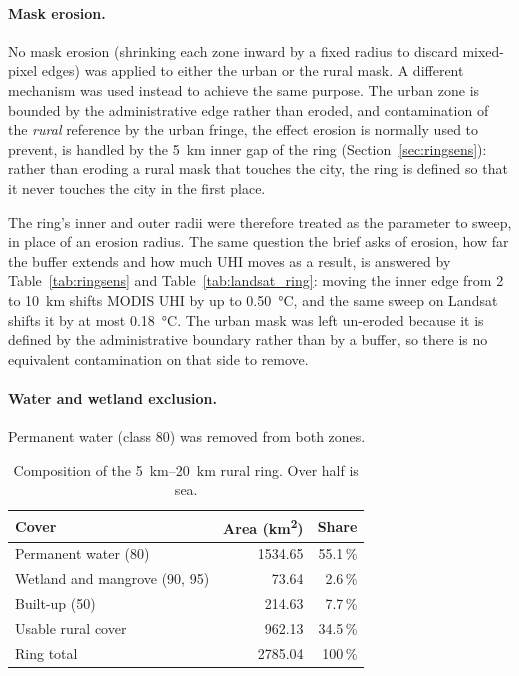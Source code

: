 \documentclass[11pt,a4paper]{article}
\begin{document}
\paragraph{Mask erosion.}
\label{sec:erosion}

No mask erosion (shrinking each zone inward by a fixed radius to
discard mixed-pixel edges) was applied to either the urban or the
rural mask. A different mechanism was used instead to achieve the same
purpose. The urban zone is bounded by the administrative edge rather
than eroded, and contamination of the \emph{rural} reference by the
urban fringe, the effect erosion is normally used to prevent, is
handled by the \SI{5}{\kilo\metre} inner gap of the ring
(Section~\ref{sec:ringsens}): rather than eroding a rural mask that
touches the city, the ring is defined so that it never touches the
city in the first place.

The ring's inner and outer radii were therefore treated as the
parameter to sweep, in place of an erosion radius. The same question
the brief asks of erosion, how far the buffer extends and how much UHI
moves as a result, is answered by
Table~\ref{tab:ringsens} and Table~\ref{tab:landsat_ring}: moving the
inner edge from \SI{2}{} to \SI{10}{\kilo\metre} shifts MODIS UHI by
up to \SI{0.50}{\degreeCelsius}, and the same sweep on Landsat shifts
it by at most \SI{0.18}{\degreeCelsius}. The urban mask was left
un-eroded because it is defined by the administrative boundary rather
than by a buffer, so there is no equivalent contamination on that side
to remove.

\paragraph{Water and wetland exclusion.}
\label{sec:waterexcl}

Permanent water (class 80) was removed from both zones.

\begin{table}[htbp]
\centering
\begin{tabular}{lrr}
\toprule
\textbf{Cover} & \textbf{Area (\si{\kilo\metre\squared})} & \textbf{Share} \\
\midrule
Permanent water (80)          & 1534.65 & 55.1\,\% \\
Wetland and mangrove (90, 95) &   73.64 &  2.6\,\% \\
Built-up (50)                 &  214.63 &  7.7\,\% \\
Usable rural cover            &  962.13 & 34.5\,\% \\
\midrule
Ring total                    & 2785.04 & 100\,\% \\
\bottomrule
\end{tabular}
\caption{Composition of the \SIrange{5}{20}{\kilo\metre} rural ring.
Over half is sea.}
\label{tab:ringcomp}
\end{table}
\end{document}
